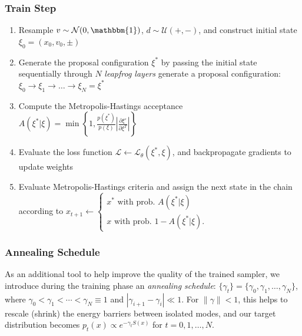 \documentclass[a4paper,11pt]{article}
\begin{document}
\subsubsection{\label{subsubsec:trainstep}Train Step}
%
\begin{enumerate}
    \item Resample \(v \sim \mathcal{N} (0, \mathbbm{1})\),
        \(d \sim \mathcal{U} (+, -)\), and construct initial state
        \(\xi_{0} = (x_{0}, v_{0}, \pm)\)
    \item Generate the proposal configuration \(\xi^{\ast}\) by passing the
        initial state sequentially through \(N\) \emph{leapfrog
        layers }%
        generate a proposal configuration: \(\xi_{0} \rightarrow \xi_{1}
        \rightarrow \ldots \rightarrow \xi_{N} = \xi^{\ast}\)
    \item Compute the Metropolis-Hastings acceptance \(A(\xi^{\ast} | \xi) =
        \min\left\{1, \frac{p(\xi^{\ast})}{p(\xi)}\left|\frac{\partial
        \xi'}{\partial \xi^{T}} \right| \right\}\)
    \item Evaluate the loss function \(\mathcal{L} \leftarrow
        \mathcal{L}_{\theta}(\xi^{\ast}, \xi)\), and backpropagate gradients to
        update weights
    \item Evaluate Metropolis-Hastings criteria and assign the next state in
        the chain according to
        \(x_{t+1} \leftarrow \begin{cases}%
            x^{\ast} \text{ with prob. } A(\xi^{\ast}|\xi) \\
            x \text{ with prob. } 1 - A(\xi^{\ast}|\xi).
        \end{cases}\)
\end{enumerate}
%
\subsubsection{\label{subsubsec:annealing}Annealing Schedule}
As an additional tool to help improve the quality of the trained sampler, we
introduce during the training phase an \emph{annealing schedule}:
\(\{\gamma_{t}\} = \{\gamma_{0}, \gamma_{1}, \ldots, \gamma_{N}\}\), where \(\gamma_{0} < \gamma_{1} < \cdots < \gamma_{N} \equiv 1\) and \(|\gamma_{i+1} - \gamma_{i}| \ll 1\).
%
For \(\|\gamma\| < 1\), this helps to rescale (shrink) the energy barriers
between isolated modes, and our target distribution becomes \(p_{t}(x) \propto
e^{-\gamma_{t} S(x)}\) for \(t = 0, 1, \ldots, N\).
%
\end{document}
